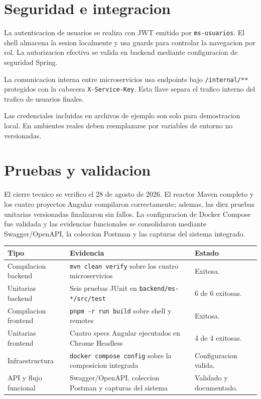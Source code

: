 \documentclass[12pt,a4paper]{article}
\begin{document}
\section{Seguridad e integracion}

La autenticacion de usuarios se realiza con JWT emitido por \texttt{ms-usuarios}. El shell almacena la sesion localmente y usa guards para controlar la navegacion por rol. La autorizacion efectiva se valida en backend mediante configuracion de seguridad Spring.

La comunicacion interna entre microservicios usa endpoints bajo \texttt{/internal/**} protegidos con la cabecera \texttt{X-Service-Key}. Esta llave separa el trafico interno del trafico de usuarios finales.

Las credenciales incluidas en archivos de ejemplo son solo para demostracion local. En ambientes reales deben reemplazarse por variables de entorno no versionadas.

\section{Pruebas y validacion}

El cierre tecnico se verifico el 28 de agosto de 2026. El reactor Maven completo y los cuatro proyectos Angular compilaron correctamente; ademas, las diez pruebas unitarias versionadas finalizaron sin fallos. La configuracion de Docker Compose fue validada y las evidencias funcionales se consolidaron mediante Swagger/OpenAPI, la coleccion Postman y las capturas del sistema integrado.

\begin{longtable}{p{4cm}p{6cm}p{4cm}}
\textbf{Tipo} & \textbf{Evidencia} & \textbf{Estado} \\
\hline
Compilacion backend & \texttt{mvn clean verify} sobre los cuatro microservicios & Exitosa. \\
Unitarias backend & Seis pruebas JUnit en \texttt{backend/ms-*/src/test} & 6 de 6 exitosas. \\
Compilacion frontend & \texttt{pnpm -r run build} sobre shell y remotes & Exitosa. \\
Unitarias frontend & Cuatro specs Angular ejecutados en Chrome Headless & 4 de 4 exitosas. \\
Infraestructura & \texttt{docker compose config} sobre la composicion integrada & Configuracion valida. \\
API y flujo funcional & Swagger/OpenAPI, coleccion Postman y capturas del sistema & Validado y documentado. \\
\end{longtable}
\end{document}
